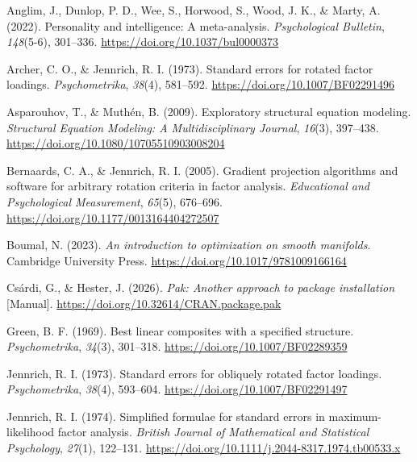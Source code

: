 \documentclass[
  12pt,
  letterpaper,
  article]{scrartcl}
\newlength{\cslhangindent}
\newenvironment{CSLReferences}[2] %
 {\begin{list}{}{%
  \setlength{\itemindent}{0pt}
  \setlength{\leftmargin}{0pt}
  \setlength{\parsep}{0pt}
  \ifodd #1
   \setlength{\leftmargin}{\cslhangindent}
   \setlength{\itemindent}{-1\cslhangindent}
  \fi
  \setlength{\itemsep}{#2\baselineskip}}}
 {\end{list}}
\begin{document}
\protect{}\label{refs}
\begin{CSLReferences}{1}{0}
Anglim, J., Dunlop, P. D., Wee, S., Horwood, S., Wood, J. K., \& Marty,
A. (2022). Personality and intelligence: {A} meta-analysis.
\emph{Psychological Bulletin}, \emph{148}(5-6), 301--336.
\url{https://doi.org/10.1037/bul0000373}

Archer, C. O., \& Jennrich, R. I. (1973). Standard errors for rotated
factor loadings. \emph{Psychometrika}, \emph{38}(4), 581--592.
\url{https://doi.org/10.1007/BF02291496}

Asparouhov, T., \& Muthén, B. (2009). Exploratory structural equation
modeling. \emph{Structural Equation Modeling: A Multidisciplinary
Journal}, \emph{16}(3), 397--438.
\url{https://doi.org/10.1080/10705510903008204}

Bernaards, C. A., \& Jennrich, R. I. (2005). Gradient projection
algorithms and software for arbitrary rotation criteria in factor
analysis. \emph{Educational and Psychological Measurement},
\emph{65}(5), 676--696. \url{https://doi.org/10.1177/0013164404272507}

Boumal, N. (2023). \emph{An introduction to optimization on smooth
manifolds}. Cambridge University Press.
\url{https://doi.org/10.1017/9781009166164}

Csárdi, G., \& Hester, J. (2026). \emph{Pak: {Another} approach to
package installation} {[}Manual{]}.
\url{https://doi.org/10.32614/CRAN.package.pak}

Green, B. F. (1969). Best linear composites with a specified structure.
\emph{Psychometrika}, \emph{34}(3), 301--318.
\url{https://doi.org/10.1007/BF02289359}

Jennrich, R. I. (1973). Standard errors for obliquely rotated factor
loadings. \emph{Psychometrika}, \emph{38}(4), 593--604.
\url{https://doi.org/10.1007/BF02291497}

Jennrich, R. I. (1974). Simplified formulae for standard errors in
maximum-likelihood factor analysis. \emph{British Journal of
Mathematical and Statistical Psychology}, \emph{27}(1), 122--131.
\url{https://doi.org/10.1111/j.2044-8317.1974.tb00533.x}


\end{CSLReferences}
\end{document}
